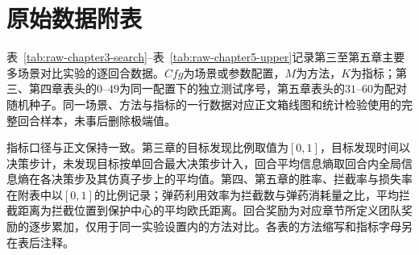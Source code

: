 \begingroup
\let\clearpage\relax
\chapter{原始数据附表}
\label{app:origin-data}
\endgroup

表~\ref{tab:raw-chapter3-search}--表~\ref{tab:raw-chapter5-upper}记录第三至第五章主要多场景对比实验的逐回合数据。$Cfg$为场景或参数配置，$M$为方法，$K$为指标；第三、第四章表头的$0$--$49$为同一配置下的独立测试序号，第五章表头的$31$--$60$为配对随机种子。同一场景、方法与指标的一行数据对应正文箱线图和统计检验使用的完整回合样本，未事后删除极端值。

指标口径与正文保持一致。第三章的目标发现比例取值为$[0,1]$，目标发现时间以决策步计，未发现目标按单回合最大决策步计入，回合平均信息熵取回合内全局信息熵在各决策步及其仿真子步上的平均值。第四、第五章的胜率、拦截率与损失率在附表中以$[0,1]$的比例记录；弹药利用效率为拦截数与弹药消耗量之比，平均拦截距离为拦截位置到保护中心的平均欧氏距离。回合奖励为对应章节所定义团队奖励的逐步累加，仅用于同一实验设置内的方法对比。各表的方法缩写和指标字母另在表后注释。

